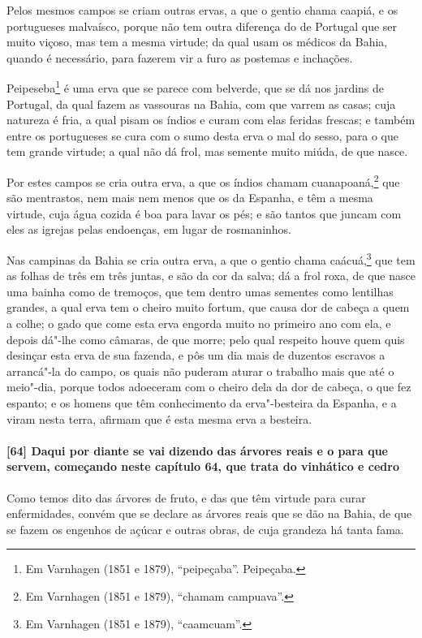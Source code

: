 \begin{linenumbers}
Pelos mesmos campos se criam outras ervas, a que o gentio chama caapiá, e os portugueses
malvaísco, porque não tem outra diferença do de Portugal que ser muito viçoso, mas tem a
mesma virtude; da qual usam os médicos da Bahia, quando é necessário, para fazerem vir a
furo as postemas e inchações.

Peipeseba\footnote{ Em Varnhagen (1851 e 1879), ``peipeçaba''. Peipeçaba.} é uma erva que
se parece com belverde, que se dá nos jardins de Portugal, da qual fazem as vassouras na
Bahia, com que varrem as casas; cuja natureza é fria, a qual pisam os índios e curam com
elas feridas frescas; e também entre os portugueses se cura com o sumo desta erva o mal do
sesso, para o que tem grande virtude; a qual não dá frol, mas semente muito miúda, de que
nasce.

Por estes campos se cria outra erva, a que os índios chamam cuanapoaná,\footnote{ Em
Varnhagen (1851 e 1879), ``chamam campuava''.} que são mentrastos, nem mais nem menos que
os da Espanha, e têm a mesma virtude, cuja água cozida é boa para lavar os pés; e são
tantos que juncam com eles as igrejas pelas endoenças, em lugar de rosmaninhos.

Nas campinas da Bahia se cria outra erva, a que o gentio chama caácuá,\footnote{ Em
Varnhagen (1851 e 1879), ``caamcuam''.} que tem as folhas de três em três juntas, e são da
cor da salva; dá a frol roxa, de que nasce uma bainha como de tremoços, que tem dentro
umas sementes como lentilhas grandes, a qual erva tem o cheiro muito fortum, que causa dor
de cabeça a quem a colhe; o gado que come esta erva engorda muito no primeiro ano com ela,
e depois dá"-lhe como câmaras, de que morre; pelo qual respeito houve quem quis desinçar
esta erva de sua fazenda, e pôs um dia mais de duzentos escravos a arrancá"-la do campo, os
quais não puderam aturar o trabalho mais que até o meio"-dia, porque todos adoeceram com o
cheiro dela da dor de cabeça, o que fez espanto; e os homens que têm conhecimento da
erva"-besteira da Espanha, e a viram nesta terra, afirmam que é esta mesma erva a besteira.

\paragraph{[64] Daqui por diante se vai dizendo das árvores reais e o para que servem,
começando neste capítulo 64, que trata do vinhático e cedro}\quad
Como temos dito das árvores de fruto, e das que têm virtude para curar enfermidades,
convém que se declare as árvores reais que se dão na Bahia, de que se fazem os engenhos de
açúcar e outras obras, de cuja grandeza há tanta fama.


\end{linenumbers}
